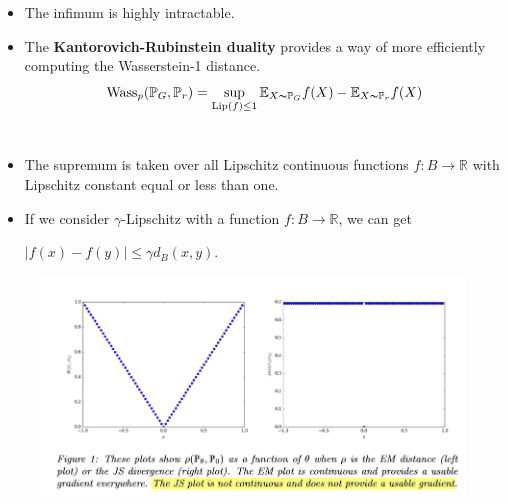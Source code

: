 \documentclass[landscape,headrule,footrule]{foils}
\begin{document}
\begin{frame}
\begin{flushleft}
\begin{itemize}
\item The infimum is highly intractable.\\
\item The \textbf{Kantorovich-Rubinstein duality} provides a way of more efficiently computing the Wasserstein-1 distance.
\begin{equation}
{\rm Wass}_p(\mathbb{P}_{G},\mathbb{P}_{r})= \mathop{\sup}_{{\rm Lip}(f)\leq 1} \mathbb{E}_{X\thicksim \mathbb{P}_{G}}f(X)- \mathbb{E}_{X\thicksim \mathbb{P}_{r}}f(X)
\end{equation}
\\
\item The supremum is taken over all Lipschitz continuous functions $f:B\rightarrow \mathbb{R}$ with Lipschitz constant equal or less than one.\\
\item If we consider $\gamma$-Lipschitz with a function $f:B\rightarrow \mathbb{R}$, we can get
\begin{center}
	$|f(x)-f(y)| \leq \gamma d_B(x,y)$.
\end{center}
\end{itemize}
\end{flushleft}
\end{frame}


\begin{frame}
\begin{flushleft}
\begin{itemize}
\begin{figure}
\center
\includegraphics[scale=0.8]{figure/fig_wgan.png}
\end{figure}

\end{itemize}
\end{flushleft}
\end{frame}
\end{document}
